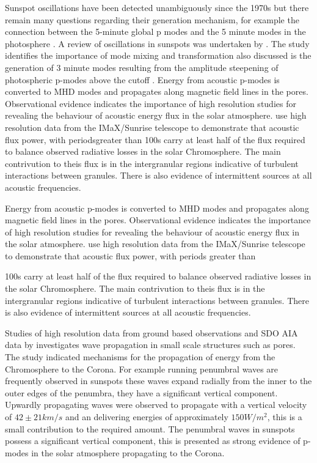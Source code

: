 \documentclass[final,1p]{elsarticle}
\begin{document}
  Sunspot oscillations have been detected unambiguously since the 1970s but there remain many questions regarding their generation mechanism, for example the connection between the 5-minute global p modes and the 5 minute modes in the photosphere  \cite{Penn1993}. A review of oscillations in sunspots was undertaken by  \cite{Bogdan2000}. The study identifies the importance of  mode mixing and transformation also discussed is the generation of 3 minute modes resulting from the amplitude steepening of photospheric p-modes above the cutoff  \cite{Bogdan2006}. Energy from acoustic p-modes is converted to MHD modes and propagates along magnetic field lines in the pores. Observational evidence indicates the importance of high resolution studies for revealing the behaviour of acoustic energy flux in the solar atmosphere. \cite{Bello2010B} use high resolution data from the IMaX/Sunrise telescope to demonstrate that acoustic flux power, with periodsgreater than 100s carry at least half of the flux required to balance observed radiative losses in the solar Chromosphere. The main contrivution to theis flux is in the intergranular regions indicative of turbulent interactions between granules. There is also evidence of intermittent sources  at all acoustic frequencies.    



 Energy from acoustic p-modes is converted to MHD modes and propagates along magnetic field lines in the pores. Observational evidence indicates the importance of high resolution studies for revealing the behaviour of acoustic energy flux in the solar atmosphere. \cite{Bello2010B} use high resolution data from the IMaX/Sunrise telescope to demonstrate that acoustic flux power, with periods greater than


 100s carry at least half of the flux required to balance observed radiative losses in the solar Chromosphere. The main contrivution to theis flux is in the intergranular regions indicative of turbulent interactions between granules. There is also evidence of intermittent sources  at all acoustic frequencies. 

Studies of high resolution data from ground based observations and SDO AIA data by \cite{Freij2014} investigates wave propagation in small scale structures such as pores. The study indicated mechanisms for the  propagation of energy from the Chromosphere to the Corona. For example running penumbral waves are frequently observed in sunspots these waves expand radially from the inner to the outer edges of the penumbra, they have a significant vertical component. Upwardly propagating waves were observed to propagate with a vertical velocity of $42\pm21km/s$ and an delivering energies of approximately $150W/m^2$, this is a small contribution to the required amount. The penumbral waves in sunspots possess a significant vertical component, this is presented as strong evidence  of p-modes in the solar atmosphere  propagating to the Corona.
\end{document}
